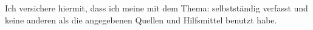 Ich versichere hiermit, dass ich meine \sDocumentTypePhrase{} mit dem Thema:
\emph{\documentTitle} selbstständig verfasst und keine anderen als die
angegebenen Quellen und Hilfsmittel benutzt habe.

%